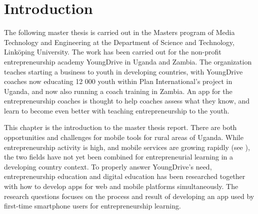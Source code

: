 \chapter{Introduction}\label{cha:intro}



The following master thesis is carried out in the Masters program of Media Technology and Engineering at the Department of Science and Technology, Linköping University. The work has been carried out for the non-profit entrepreneurship academy YoungDrive in Uganda and Zambia. The organization teaches starting a business to youth in developing countries, with YoungDrive coaches now educating 12 000 youth within Plan International's project in Uganda, and now also running a coach training in Zambia. An app for the entrepreneurship coaches is thought to help coaches assess what they know, and learn to become even better with teaching entrepreneurship to the youth.

This chapter is the introduction to the master thesis report. There are both opportunities and challenges for mobile tools for rural areas of Uganda. While entrepreneurship activity is high, and mobile services are growing rapidly (see \label{sec:related-work}), the two fields have not yet been combined for entrepreneurial learning in a developing country context. To properly answer YoungDrive's need, entrepreneurship education and digital education has been researched together with how to develop apps for web and mobile platforms simultaneously. The research questions focuses on the process and result of developing an app used by first-time smartphone users for entrepreneurship learning.



% 

%





%

%

%

